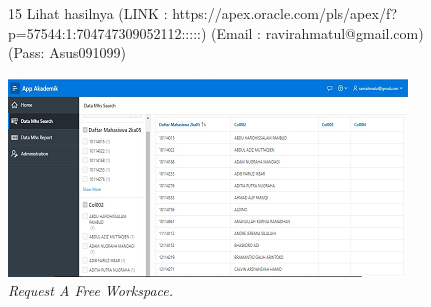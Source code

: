 \begin{enumerate}
\begin{figure}[!htbp]
\item[15]Lihat hasilnya (LINK : https://apex.oracle.com/pls/apex/f?p=57544:1:704747309052112:::::) (Email : ravirahmatul@gmail.com) (Pass: Asus091099)

    \begin{center}
    \includegraphics[scale=0.5]{figures/15.png}
    \caption{\textit{Request A Free Workspace.}}
    \end{center}
    \end{figure}


\end{enumerate}
